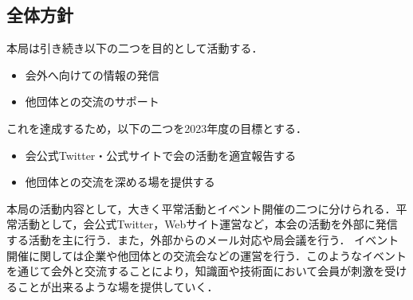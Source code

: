 \subsection*{全体方針}


本局は引き続き以下の二つを目的として活動する．

\begin{itemize}
    \item 会外へ向けての情報の発信
    \item 他団体との交流のサポート
\end{itemize}

これを達成するため，以下の二つを2023年度の目標とする．
\begin{itemize}
  \item 会公式Twitter・公式サイトで会の活動を適宜報告する
  \item 他団体との交流を深める場を提供する
\end{itemize}

本局の活動内容として，大きく平常活動とイベント開催の二つに分けられる．平常活動として，会公式Twitter，Webサイト運営など，本会の活動を外部に発信する活動を主に行う．また，外部からのメール対応や局会議を行う．
イベント開催に関しては企業や他団体との交流会などの運営を行う．このようなイベントを通じて会外と交流することにより，知識面や技術面において会員が刺激を受けることが出来るような場を提供していく．